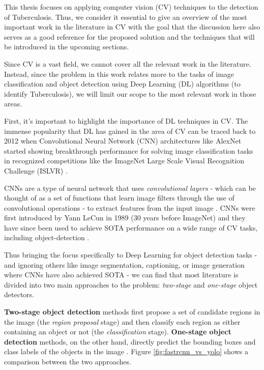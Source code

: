 \documentclass[../main.tex]{subfiles}
\begin{document}
    This thesis focuses on applying computer vision (CV) techniques to the detection of Tuberculosis. Thus, we consider it essential to give an overview of the most important work in the literature in CV with the goal that the discussion here also serves as a good reference for the proposed solution and the techniques that will be introduced in the upcoming sections. 
    
    Since CV is a vast field, we cannot cover all the relevant work in the literature. Instead, since the problem in this work relates more to the tasks of image classification and object detection using Deep Learning (DL) algorithms (to identify Tuberculosis), we will limit our scope to the most relevant work in those areas.

    First, it's important to highlight the importance of DL techniques in CV. The immense popularity that DL has gained in the area of CV can be traced back to 2012 when Convolutional Neural Network (CNN) architectures like AlexNet \cite{dengImageNetLargescaleHierarchical2009} started showing breakthrough performance for solving image classification tasks in recognized competitions like the ImageNet Large Scale Visual Recognition Challenge (ISLVR) \cite{krizhevskyImageNetClassificationDeep2012}.
    
    CNNs are a type of neural network that uses \textit{convolutional layers} - which can be thought of as a set of functions that learn image filters through the use of convolutional operations - to extract features from the input image \autocite{goodfellowDeepLearning2016}. CNNs were first introduced by Yann LeCun in 1989 \cite{lecunBackpropagationAppliedHandwritten1989} (30 years before ImageNet) and they have since been used to achieve SOTA performance on a wide range of CV tasks, including object-detection \cite{lecun_deep_2015,zouObjectDetection202023b}.

    Thus bringing the focus specifically to Deep Learning for object detection tasks - and ignoring others like image segmentation, captioning, or image generation where CNNs have also achieved SOTA -  we can find that most literature is divided into two main approaches to the problem: \textit{two-stage} and \textit{one-stage} object detectors.
    
    \textbf{Two-stage object detection} methods first propose a set of candidate regions in the image (the \textit{region proposal} stage) and then classify each region as either containing an object or not (the \textit{classification} stage). \textbf{One-stage object detection} methods, on the other hand, directly predict the bounding boxes and class labels of the objects in the image \cite{zouObjectDetection202023b}. Figure \ref{fig:fastrcnn_vs_yolo} shows a comparison between the two approaches.
    
\end{document}

